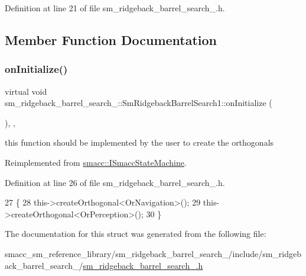 Definition at line 21 of file sm\+\_\+ridgeback\+\_\+barrel\+\_\+search\+\_.\+h.



\subsection{Member Function Documentation}
\mbox{\label{structsm__ridgeback__barrel__search__1_1_1SmRidgebackBarrelSearch1_a01130957b940856c2ceb7710c37078de}} 
\subsubsection{\texorpdfstring{on\+Initialize()}{onInitialize()}}
{\footnotesize\ttfamily virtual void sm\+\_\+ridgeback\+\_\+barrel\+\_\+search\+\_\+::\+Sm\+Ridgeback\+Barrel\+Search1\+::on\+Initialize (\begin{DoxyParamCaption}{ }\end{DoxyParamCaption})\hspace{0.3cm}{\ttfamily [inline]}, {\ttfamily [override]}, {\ttfamily [virtual]}}



this function should be implemented by the user to create the orthogonals 



Reimplemented from \hyperlink{classsmacc_1_1ISmaccStateMachine_ac2982c6c8283663e5e1e8a7c82f511ec}{smacc\+::\+I\+Smacc\+State\+Machine}.



Definition at line 26 of file sm\+\_\+ridgeback\+\_\+barrel\+\_\+search\+\_.\+h.


\begin{DoxyCode}
27     \{
28         this->createOrthogonal<OrNavigation>();
29         this->createOrthogonal<OrPerception>();
30     \}
\end{DoxyCode}


The documentation for this struct was generated from the following file\+:\begin{DoxyCompactItemize}
\item 
smacc\+\_\+sm\+\_\+reference\+\_\+library/sm\+\_\+ridgeback\+\_\+barrel\+\_\+search\+\_/include/sm\+\_\+ridgeback\+\_\+barrel\+\_\+search\+\_/\hyperlink{sm__ridgeback__barrel__search__1_8h}{sm\+\_\+ridgeback\+\_\+barrel\+\_\+search\+\_.\+h}\end{DoxyCompactItemize}

